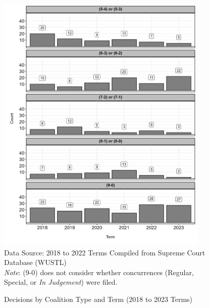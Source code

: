 
\begin{figure}[H]
    \centering
    \caption{Decisions by Coalition Type and Term (2018 to 2023 Terms)}
    \includegraphics[width=0.9\textwidth]{Figures/statpack_figures/decisions_by_coalition_2018_2023.png} \\
    \footnotesize{Data Source: 2018 to 2022 Terms Compiled from Supreme Court Database (WUSTL)} \\
    \footnotesize{\emph{Note}: (9-0) does not consider whether concurrences (Regular, Special, or \emph{In Judgement}) were filed.}
\end{figure}


